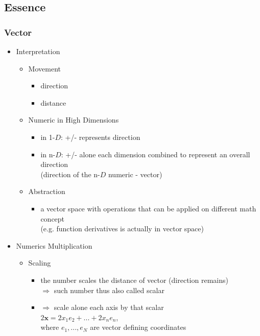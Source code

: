 \subsection{Essence}
\subsubsection{Vector}
\begin{itemize}
\item Interpretation
	\begin{itemize}
	\item Movement
		\begin{itemize}
		\item direction
		\item distance
		\end{itemize}
	\item Numeric in High Dimensions
		\begin{itemize}
		\item in 1-$D$: +/- represents direction
		\item in n-$D$: +/- alone each dimension combined to represent an overall direction \\
		(direction of the n-$D$ numeric - vector)
		\end{itemize}
	\item Abstraction
		\begin{itemize}
		\item a vector space with operations that can be applied on different math concept \\
		(e.g. function derivatives is actually in vector space)
		\end{itemize}
	\end{itemize}

\item Numerics Multiplication
	\begin{itemize}
	\item Scaling
		\begin{itemize}
		\item the number scales the distance of vector (direction remains) \\
			$\Rightarrow$ such number thus also called scalar
		\item $\Rightarrow$ scale alone each axis by that scalar \\
			$2\mathbf x = 2x_1e_2+...+2x_ne_n$, \\ 
			where $e_1,...,e_N$ are vector defining coordinates
		\end{itemize}
	\end{itemize}


\end{itemize}
